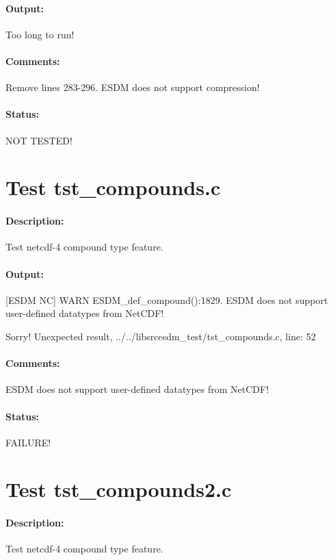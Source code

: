 \paragraph{Output:} Too long to run!

\paragraph{Comments:} Remove lines 283-296. ESDM does not support compression!

\paragraph{Status:} NOT TESTED!

\section{Test tst\_compounds.c}

\paragraph{Description:} Test netcdf-4 compound type feature.

\paragraph{Output:} [ESDM NC] WARN ESDM\_def\_compound():1829. ESDM does not support user-defined datatypes from NetCDF!

Sorry! Unexpected result, ../../libsrcesdm\_test/tst\_compounds.c, line: 52

\paragraph{Comments:} ESDM does not support user-defined datatypes from NetCDF!

\paragraph{Status:} FAILURE!

\section{Test tst\_compounds2.c}

\paragraph{Description:} Test netcdf-4 compound type feature.

